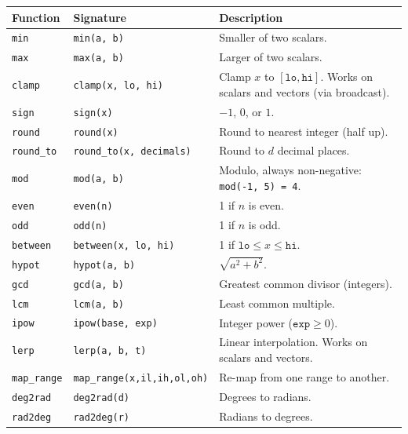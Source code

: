 \documentclass[11pt,a4paper]{article}
\begin{document}
\begin{longtable}{@{}L{3.5cm}L{4.5cm}L{6.5cm}@{}}
\toprule
\textbf{Function} & \textbf{Signature} & \textbf{Description} \\
\midrule
\endhead
\texttt{min}       & \texttt{min(a, b)}                  & Smaller of two scalars. \\
\texttt{max}       & \texttt{max(a, b)}                  & Larger of two scalars. \\
\texttt{clamp}     & \texttt{clamp(x, lo, hi)}           & Clamp $x$ to $[\texttt{lo}, \texttt{hi}]$. Works on scalars and vectors (via broadcast). \\
\texttt{sign}      & \texttt{sign(x)}                    & $-1$, $0$, or $1$. \\
\texttt{round}     & \texttt{round(x)}                   & Round to nearest integer (half up). \\
\texttt{round\_to} & \texttt{round\_to(x, decimals)}     & Round to $d$ decimal places. \\
\texttt{mod}       & \texttt{mod(a, b)}                  & Modulo, always non-negative: \texttt{mod(-1, 5) = 4}. \\
\texttt{even}      & \texttt{even(n)}                    & 1 if $n$ is even. \\
\texttt{odd}       & \texttt{odd(n)}                     & 1 if $n$ is odd. \\
\texttt{between}   & \texttt{between(x, lo, hi)}         & 1 if $\texttt{lo} \le x \le \texttt{hi}$. \\
\texttt{hypot}     & \texttt{hypot(a, b)}                & $\sqrt{a^2 + b^2}$. \\
\texttt{gcd}       & \texttt{gcd(a, b)}                  & Greatest common divisor (integers). \\
\texttt{lcm}       & \texttt{lcm(a, b)}                  & Least common multiple. \\
\texttt{ipow}      & \texttt{ipow(base, exp)}            & Integer power ($\texttt{exp} \ge 0$). \\
\texttt{lerp}      & \texttt{lerp(a, b, t)}              & Linear interpolation. Works on scalars and vectors. \\
\texttt{map\_range}& \texttt{map\_range(x,il,ih,ol,oh)}  & Re-map from one range to another. \\
\texttt{deg2rad}   & \texttt{deg2rad(d)}                 & Degrees to radians. \\
\texttt{rad2deg}   & \texttt{rad2deg(r)}                 & Radians to degrees. \\
\bottomrule
\end{longtable}
\end{document}
